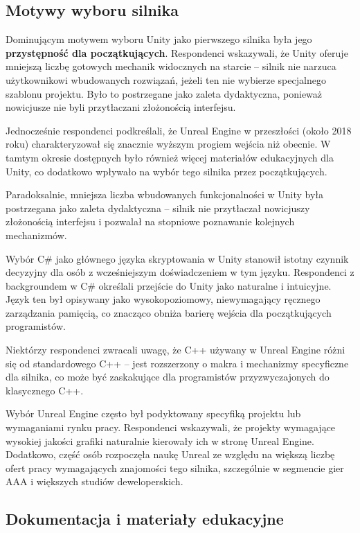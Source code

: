 \subsection{Motywy wyboru silnika}
\label{subsec:motywy-wyboru}


Dominującym motywem wyboru Unity jako pierwszego silnika była jego \textbf{przystępność dla początkujących}. Respondenci wskazywali, że Unity oferuje mniejszą liczbę gotowych mechanik widocznych na starcie -- silnik nie narzuca użytkownikowi wbudowanych rozwiązań, jeżeli ten nie wybierze specjalnego szablonu projektu. Było to postrzegane jako zaleta dydaktyczna, ponieważ nowicjusze nie byli przytłaczani złożonością interfejsu.

Jednocześnie respondenci podkreślali, że Unreal Engine w przeszłości (około 2018 roku) charakteryzował się znacznie wyższym progiem wejścia niż obecnie. W tamtym okresie dostępnych było również więcej materiałów edukacyjnych dla Unity, co dodatkowo wpływało na wybór tego silnika przez początkujących.

Paradoksalnie, mniejsza liczba wbudowanych funkcjonalności w Unity była postrzegana jako zaleta dydaktyczna -- silnik nie przytłaczał nowicjuszy złożonością interfejsu i pozwalał na stopniowe poznawanie kolejnych mechanizmów.


Wybór C\# jako głównego języka skryptowania w Unity stanowił istotny czynnik decyzyjny dla osób z wcześniejszym doświadczeniem w tym języku. Respondenci z backgroundem w C\# określali przejście do Unity jako naturalne i intuicyjne. Język ten był opisywany jako wysokopoziomowy, niewymagający ręcznego zarządzania pamięcią, co znacząco obniża barierę wejścia dla początkujących programistów.

Niektórzy respondenci zwracali uwagę, że C++ używany w Unreal Engine różni się od standardowego C++ -- jest rozszerzony o makra i mechanizmy specyficzne dla silnika, co może być zaskakujące dla programistów przyzwyczajonych do klasycznego C++.


Wybór Unreal Engine często był podyktowany specyfiką projektu lub wymaganiami rynku pracy. Respondenci wskazywali, że projekty wymagające wysokiej jakości grafiki naturalnie kierowały ich w stronę Unreal Engine. Dodatkowo, część osób rozpoczęła naukę Unreal ze względu na większą liczbę ofert pracy wymagających znajomości tego silnika, szczególnie w segmencie gier AAA i większych studiów deweloperskich.

\subsection{Dokumentacja i materiały edukacyjne}
\label{subsec:dokumentacja}


